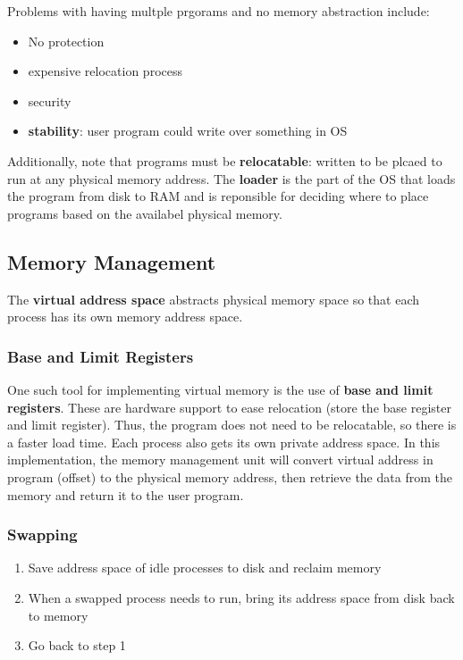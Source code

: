 \documentclass{article}
\newcommand{\bold}[1]{\textbf{#1}}
\renewcommand{\b}{\item[$\circ$]}
\newcommand{\newlist}{\begin{itemize}}
\renewcommand{\endlist}{\end{itemize}}
\begin{document}
Problems with having multple prgorams and no memory abstraction include:

\newlist 
\b No protection
\b expensive relocation process
\b security
\b \bold{stability}: user program could write over something in OS
\endlist

Additionally, note that programs must be \bold{relocatable}: written to be plcaed to run at any physical memory address. The \bold{loader} is the part of the OS that loads the program from disk to RAM and is reponsible for deciding where to place programs based on the availabel physical memory.  \\ 

\subsection{Memory Management}

The \bold{virtual address space} abstracts physical memory space so that each process has its own memory address space. \\ 

\subsubsection{Base and Limit Registers}

One such tool for implementing virtual memory is the use of \bold{base and limit registers}. These are hardware support to ease relocation (store the base register and limit register). Thus, the program does not need to be relocatable, so there is a faster load time. Each process also gets its own private address space. In this implementation, the memory management unit will convert virtual address in program (offset) to the physical memory address, then retrieve the data from the memory and return it to the user program. 

\subsubsection{Swapping}

\begin{enumerate}
    \item Save address space of idle processes to disk and reclaim memory
    \item When a swapped process needs to run, bring its address space from disk back to memory
    \item Go back to step 1
\end{enumerate}
\end{document}
